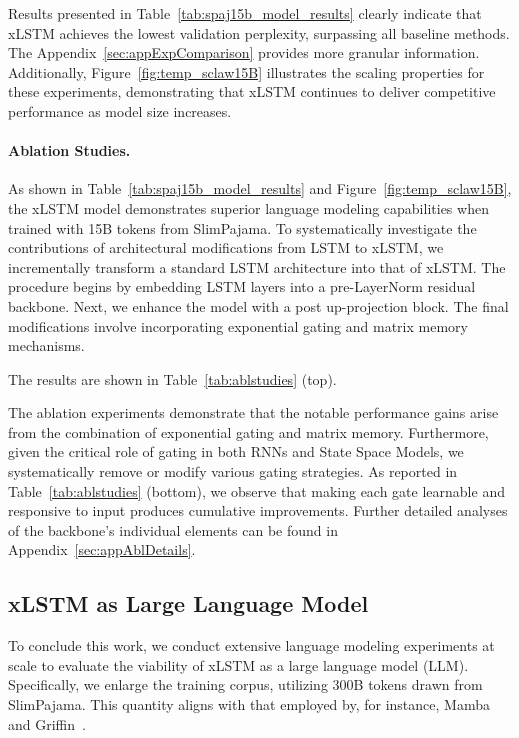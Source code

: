 Results presented in Table~\ref{tab:spaj15b_model_results} clearly indicate that xLSTM achieves the lowest validation perplexity, surpassing all baseline methods. The Appendix~\ref{sec:appExpComparison} provides more granular information. Additionally, Figure~\ref{fig:temp_sclaw15B} illustrates the scaling properties for these experiments, demonstrating that xLSTM continues to deliver competitive performance as model size increases.

\paragraph{Ablation Studies.}
As shown in Table~\ref{tab:spaj15b_model_results} and Figure~\ref{fig:temp_sclaw15B}, the xLSTM model demonstrates superior language modeling capabilities when trained with 15B tokens from SlimPajama. To systematically investigate the contributions of architectural modifications from LSTM to xLSTM, we incrementally transform a standard LSTM architecture into that of xLSTM. The procedure begins by embedding LSTM layers into a pre-LayerNorm residual backbone. Next, we enhance the model with a post up-projection block. The final modifications involve incorporating exponential gating and matrix memory mechanisms.

The results are shown in Table~\ref{tab:ablstudies} (top). 

The ablation experiments demonstrate that the notable performance gains arise from the combination of exponential gating and matrix memory. Furthermore, given the critical role of gating in both RNNs and State Space Models, we systematically remove or modify various gating strategies. As reported in Table~\ref{tab:ablstudies} (bottom), we observe that making each gate learnable and responsive to input produces cumulative improvements. Further detailed analyses of the backbone's individual elements can be found in Appendix~\ref{sec:appAblDetails}.

\subsection{xLSTM as Large Language Model}
\label{sec:ExpLanguage}

To conclude this work, we conduct extensive language modeling experiments at scale to evaluate the viability of xLSTM as a large language model (LLM). Specifically, we enlarge the training corpus, utilizing 300B tokens drawn from SlimPajama. This quantity aligns with that employed by, for instance, Mamba~\citep{Gu:24arxiv} and Griffin~\citep{De:24arxiv}.

